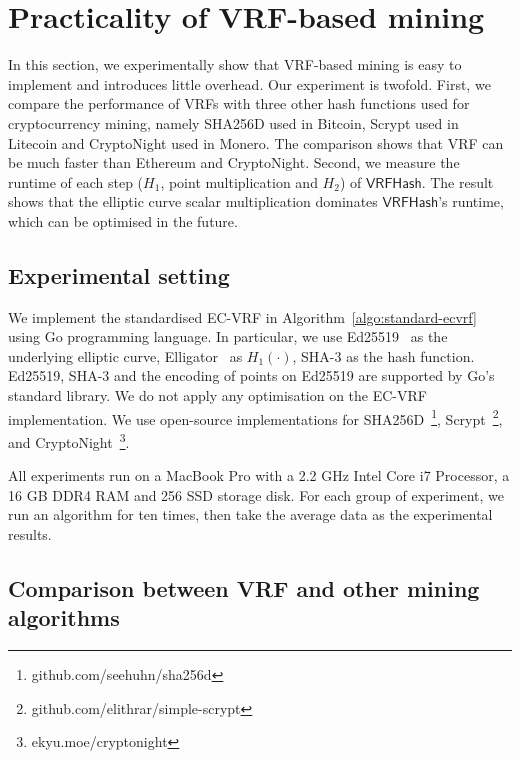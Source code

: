 \section{Practicality of VRF-based mining}
\label{sec:practicality}

In this section, we experimentally show that VRF-based mining is easy to implement and introduces little overhead.
Our experiment is twofold.
First, we compare the performance of VRFs with three other hash functions used for cryptocurrency mining, namely SHA256D used in Bitcoin, Scrypt used in Litecoin and CryptoNight used in Monero.
The comparison shows that VRF can be much faster than Ethereum and CryptoNight.
Second, we measure the runtime of each step ($H_1$, point multiplication and $H_2$) of $\mathsf{VRFHash}$.
The result shows that the elliptic curve scalar multiplication dominates $\mathsf{VRFHash}$'s runtime, which can be optimised in the future.

\subsection{Experimental setting}

We implement the standardised EC-VRF in Algorithm~\ref{algo:standard-ecvrf} using Go programming language.
In particular, we use Ed25519~\cite{bernstein2012high} as the underlying elliptic curve, Elligator~\cite{bernstein2013elligator} as $H_1(\cdot)$, SHA-3 as the hash function.
Ed25519, SHA-3 and the encoding of points on Ed25519 are supported by Go's standard library.
We do not apply any optimisation on the EC-VRF implementation.
We use open-source implementations for SHA256D~\footnote{github.com/seehuhn/sha256d}, Scrypt~\footnote{github.com/elithrar/simple-scrypt}, and CryptoNight~\footnote{ekyu.moe/cryptonight}.

All experiments run on a MacBook Pro with a 2.2 GHz Intel Core i7 Processor, a 16 GB DDR4 RAM and 256 SSD storage disk.
For each group of experiment, we run an algorithm for ten times, then take the average data as the experimental results.




\subsection{Comparison between VRF and other mining algorithms}

